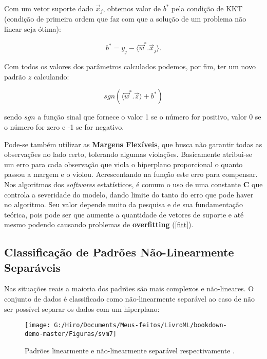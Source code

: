 \documentclass[
  openany]{book}
\begin{document}
Com um vetor suporte dado \(\vec{x}_j\), obtemos valor de \(b^*\) pela condição de KKT (condição de primeira ordem que faz com que a solução de um problema não linear seja ótima):

\begin{equation}
b^* =y_j-\langle\vec{w}^*.\vec{x}_j \rangle.
\label{eq:kktsvm}
\end{equation}

Com todos os valores dos parâmetros calculados podemos, por fim, ter um novo padrão \(z\) calculando:

\begin{equation}
sgn(\langle \vec{w}^* . \vec{z}\rangle+b^*)
\label{eq:sgn}
\end{equation}

sendo \(sgn\) a função sinal que fornece o valor 1 se o número for positivo, valor 0 se o número for zero e -1 se for negativo.

Pode-se também utilizar as \textbf{Margens Flexíveis}, que busca não garantir todas as observações no lado certo, tolerando algumas violações. Basicamente atribui-se um erro para cada observação que viola o hiperplano proporcional o quanto passou a margem e o violou. Acrescentando na função este erro para compensar. Nos algoritmos dos \emph{softwares} estatísticos, é comum o uso de uma constante \textbf{C} que controla a severidade do modelo, dando limite do tanto do erro que pode haver no algoritmo. Seu valor depende muito da pesquisa e de sua fundamentação teórica, pois pode ser que aumente a quantidade de vetores de suporte e até mesmo podendo causando problemas de \textbf{overfitting} (\ref{fitt}).

\hypertarget{classificauxe7uxe3o-de-padruxf5es-nuxe3o-linearmente-separuxe1veis}{%
\subsection{Classificação de Padrões Não-Linearmente Separáveis}\label{classificauxe7uxe3o-de-padruxf5es-nuxe3o-linearmente-separuxe1veis}}

Nas situações reais a maioria dos padrões são mais complexos e não-lineares. O conjunto de dados é classificado como não-linearmente separável ao caso de não ser possível separar os dados com um hiperplano:

\begin{figure}

{\centering \texttt{[image: G:/Hiro/Documents/Meus-feitos/LivroML/bookdown-demo-master/Figuras/svm7]} 

}

\caption{Padrões linearmente e não-linearmente separável respectivamente \citep{gonccalves2015maquina}.}\label{fig:svm7}
\end{figure}
\end{document}
